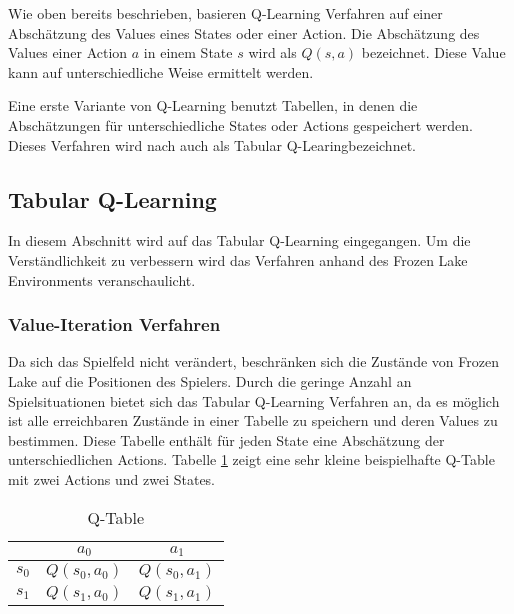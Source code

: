 \documentclass[11pt]{scrartcl}
\begin{document}
Wie oben bereits beschrieben, basieren Q-Learning Verfahren auf einer Abschätzung des
Values eines States oder einer Action. Die Abschätzung des Values einer Action $a$ in
einem State $s$ wird als $Q(s, a)$ bezeichnet. Diese Value kann auf unterschiedliche
Weise ermittelt werden.

Eine erste Variante von Q-Learning benutzt Tabellen, in denen die Abschätzungen
für unterschiedliche States oder Actions gespeichert werden. Dieses Verfahren wird nach
\cite[~S.193]{L2018} auch als \grqq Tabular Q-Learing\grqq bezeichnet.


\subsection{Tabular Q-Learning}
In diesem Abschnitt wird auf das Tabular Q-Learning eingegangen. Um die
Ver\-ständ\-lich\-keit zu verbessern wird das Verfahren anhand des Frozen Lake
Environments veranschaulicht.


\subsubsection{Value-Iteration Verfahren}
Da sich das Spielfeld nicht verändert, beschränken sich die Zustände von Frozen Lake auf
die Positionen des Spielers. Durch die geringe Anzahl an Spielsituationen bietet sich das
Tabular Q-Learning Verfahren an, da es möglich ist alle erreichbaren Zustände in einer
Tabelle zu speichern und deren Values zu bestimmen. Diese Tabelle enthält für jeden State
eine Abschätzung der unterschiedlichen Actions. Tabelle \ref{tab:q_table} zeigt eine
sehr kleine beispielhafte Q-Table mit zwei Actions und zwei States.

\begin{table}[ht]
  \begin{center}
    \begin{tabular}{c | c | c}
       & $a_0$ & $a_1$ \\
      \hline
      $s_0$ & $Q(s_0, a_0)$ &$ Q(s_0, a_1)$ \\
      \hline
      $s_1$ & $Q(s_1, a_0)$ & $Q(s_1, a_1)$ \\
    \end{tabular}

    \caption[Q-Table]{Q-Table}
    \label{tab:q_table}
  \end{center}
\end{table}
\end{document}

